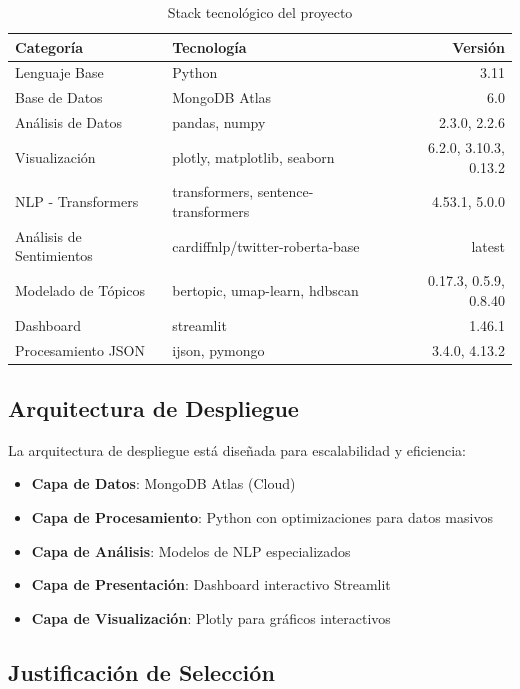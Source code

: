 \documentclass[12pt,a4paper,twoside,openany]{book}
\begin{document}
\begin{table}[H]
\centering
\caption{Stack tecnológico del proyecto}
\begin{tabular}{@{}llr@{}}
\toprule
\textbf{Categoría} & \textbf{Tecnología} & \textbf{Versión} \\
\midrule
Lenguaje Base & Python & 3.11 \\
Base de Datos & MongoDB Atlas & 6.0 \\
Análisis de Datos & pandas, numpy & 2.3.0, 2.2.6 \\
Visualización & plotly, matplotlib, seaborn & 6.2.0, 3.10.3, 0.13.2 \\
NLP - Transformers & transformers, sentence-transformers & 4.53.1, 5.0.0 \\
Análisis de Sentimientos & cardiffnlp/twitter-roberta-base & latest \\
Modelado de Tópicos & bertopic, umap-learn, hdbscan & 0.17.3, 0.5.9, 0.8.40 \\
Dashboard & streamlit & 1.46.1 \\
Procesamiento JSON & ijson, pymongo & 3.4.0, 4.13.2 \\
\bottomrule
\end{tabular}
\end{table}

\subsection{Arquitectura de Despliegue}

La arquitectura de despliegue está diseñada para escalabilidad y eficiencia:

\begin{itemize}
    \item \textbf{Capa de Datos}: MongoDB Atlas (Cloud)
    \item \textbf{Capa de Procesamiento}: Python con optimizaciones para datos masivos
    \item \textbf{Capa de Análisis}: Modelos de NLP especializados
    \item \textbf{Capa de Presentación}: Dashboard interactivo Streamlit
    \item \textbf{Capa de Visualización}: Plotly para gráficos interactivos
\end{itemize}

\subsection{Justificación de Selección}
\end{document}
